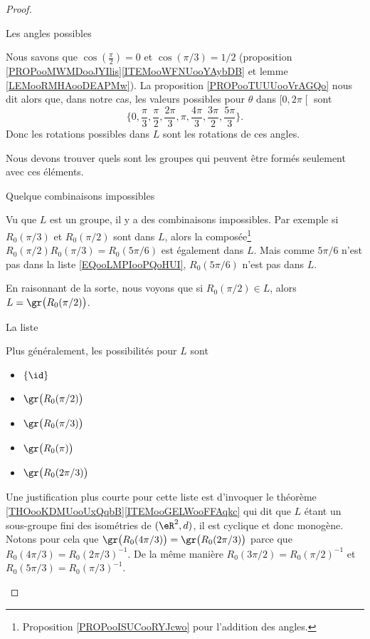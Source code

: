 \begin{proof}
\begin{subproof}
            \item[Les angles possibles]

                Nous savons que \( \cos(\frac{ \pi }{2})=0\) et \( \cos(\pi/3)=1/2\) (proposition \ref{PROPooMWMDooJYIlis}\ref{ITEMooWFNUooYAybDB} et lemme \ref{LEMooRMHAooDEAPMw}). La proposition \ref{PROPooTUUUooVrAGQo} nous dit alors que, dans notre cas, les valeurs possibles pour \( \theta\) dans \( \mathopen[ 0 , 2\pi \mathclose[\) sont
                    \begin{equation}        \label{EQooLMPIooPQoHUI}
                    \{ 0,\frac{ \pi }{ 3 },\frac{ \pi }{ 2 }, \frac{ 2\pi }{ 3 }, \pi,\frac{ 4\pi }{ 3 }, \frac{ 3\pi }{ 2 },\frac{ 5\pi }{ 3 } \}.
                \end{equation}
                Donc les rotations possibles dans \( L\) sont les rotations de ces angles.

                Nous devons trouver quels sont les groupes qui peuvent être formés seulement avec ces éléments.

            \item[Quelque combinaisons impossibles]

                Vu que \( L\) est un groupe, il y a des combinaisons impossibles. Par exemple si \( R_0(\pi/3)\) et \( R_0(\pi/2)\) sont dans \( L\), alors la composée\footnote{Proposition \ref{PROPooISUCooRYJcwo} pour l'addition des angles.} \( R_0(\pi/2)R_0(\pi/3)=R_0(5\pi/6)\) est également dans \( L\). Mais comme \( 5\pi/6\) n'est pas dans la liste \eqref{EQooLMPIooPQoHUI}, \( R_0(5\pi/6)\) n'est pas dans \( L\).
            
                En raisonnant de la sorte, nous voyons que si \( R_0(\pi/2)\in L\), alors \( L=\gr\big( R_0(\pi/2) \big)\).

            \item[La liste]

                Plus généralement, les possibilités pour \( L\) sont
                \begin{itemize}
                    \item \( \{ \id \}\)
                    \item \( \gr\big( R_0(\pi/2) \big)\)
                    \item \( \gr\big( R_0(\pi/3) \big)\)
                    \item \( \gr\big( R_0(\pi) \big)\)
                    \item \( \gr\big( R_0(2\pi/3) \big)\)
                \end{itemize}
                Une justification plus courte pour cette liste est d'invoquer le théorème \ref{THOooKDMUooUxQqbB}\ref{ITEMooGELWooFFAqkc} qui dit que \( L\) étant un sous-groupe fini des isométries de \( (\eR^2,d)\), il est cyclique et donc monogène. Notons pour cela que \( \gr\big( R_0(4\pi/3) \big)=\gr\big( R_0(2\pi/3) \big)\) parce que \( R_0(4\pi/3)=R_0(2\pi/3)^{-1}\). De la même manière \( R_0(3\pi/2)=R_0(\pi/2)^{-1}\) et \( R_0(5\pi/3)=R_0(\pi/3)^{-1}\).


\end{subproof}
\end{proof}
